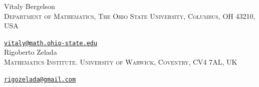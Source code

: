 \documentclass[11pt,american,preprint]{elsarticle}
\numberwithin{equation}{section}
\theoremstyle{plain}
\theoremstyle{plain*}
\theoremstyle{plain}
\theoremstyle{plain*}
\theoremstyle{plain}
\theoremstyle{plain*}
\theoremstyle{remark}
\theoremstyle{remark*}
\theoremstyle{remark}
\theoremstyle{remark*}
\theoremstyle{remark}
\theoremstyle{remark*}
\theoremstyle{plain}
\theoremstyle{definition}
\theoremstyle{plain}
\theoremstyle{plain} %
\begin{document}
  

\vspace{0.5em}
\noindent
{\small Vitaly Bergelson\\
\textsc{Department of Mathematics, The Ohio State University, Columbus, OH 43210, USA}\par\nopagebreak
\noindent
\href{mailto:vitaly@math.ohio-state.edu}
{\texttt{vitaly@math.ohio-state.edu}}
\vspace{0.5em}\\
\noindent
Rigoberto Zelada\\
\textsc{Mathematics Institute. University of Warwick, Coventry, CV4 7AL, UK}\par\nopagebreak
\noindent
\href{mailto:rzelada@umd.edu}
{\texttt{rigozelada@gmail.com}}}
\end{document}
